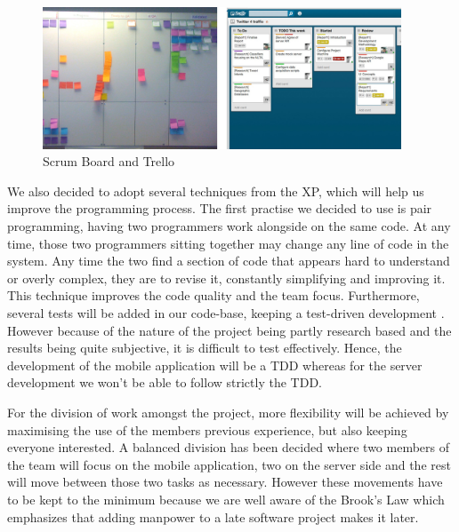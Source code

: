\begin{figure}[here]
\begin{minipage}{\textwidth}
\begin{center}
\includegraphics[width=0.95\textwidth]{images/scrumboard.jpg}
\end{center}
\caption[Caption for LOF]{Scrum Board and Trello\footnotemark}
\end{minipage} 
\end{figure}


We also decided to adopt several techniques from the XP, which will help us improve the programming process. The first practise we decided to use is pair programming, having two programmers work alongside on the same code. At any time, those two programmers sitting together may change any line of code in the system. Any time the two find a section of code that appears hard to understand or overly complex, they are to revise it, constantly simplifying and improving it. This technique improves the code quality and the team focus. Furthermore, several tests will be added in our code-base, keeping a test-driven development . However because of the nature of the project being partly research based and the results being quite subjective, it is difficult to test effectively. Hence, the development of the mobile application will be a TDD whereas for the server development we won't be able to follow strictly the TDD.\cite{Cockburn}

For the division of work amongst the project, more flexibility will be achieved by maximising the use of the members previous experience, but also keeping everyone interested. A balanced division has been decided where two members of the team will focus on the mobile application, two on the server side and the rest will move between those two tasks as necessary. However these movements have to be kept to the minimum because we are well aware of the Brook's Law which emphasizes that adding manpower to a late software project makes it later.\cite{Brooks}

